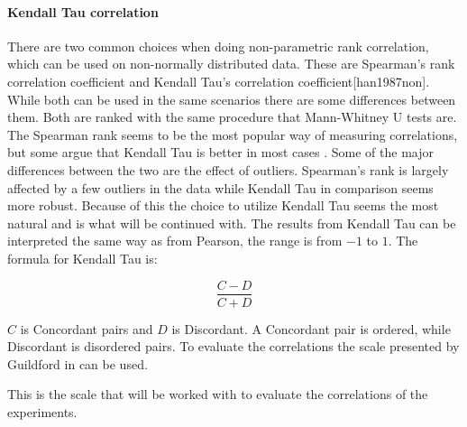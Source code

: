 \paragraph{Kendall Tau correlation}
There are two common choices when doing non-parametric rank correlation, which can be used on non-normally distributed data. These are Spearman's rank correlation coefficient and Kendall Tau's correlation coefficient[han1987non]. While both can be used in the same scenarios there are some differences between them. Both are ranked with the same procedure that Mann-Whitney U tests are. The Spearman rank seems to be the most popular way of measuring correlations, but some argue that Kendall Tau is better in most cases \cite{gilpin1993table}. Some of the major differences between the two are the effect of outliers. Spearman's rank is largely affected by a few outliers in the data while Kendall Tau in comparison seems more robust. Because of this the choice to utilize Kendall Tau seems the most natural and is what will be continued with. The results from Kendall Tau can be interpreted the same way as from Pearson, the range is from $-1$ to $1$. The formula for Kendall Tau is:

\begin{equation}
    \frac{C-D}{C+D}
\end{equation}

$C$ is Concordant pairs and $D$ is Discordant. A Concordant pair is ordered, while Discordant is disordered pairs\cite{kendall1938new}. To evaluate the correlations the scale presented by Guildford in \cite[219]{guilford1950fundamental} can be used.



This is the scale that will be worked with to evaluate the correlations of the experiments.

